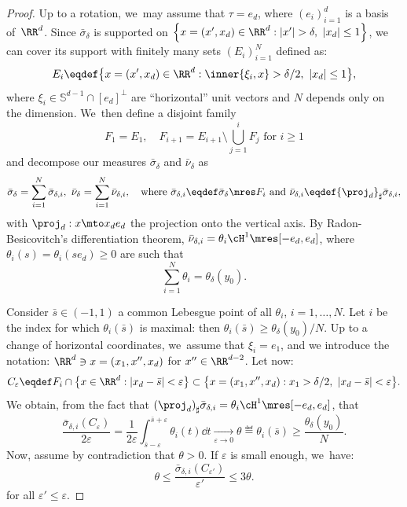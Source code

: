 \begin{proof}
Up to a rotation, we~may assume that $\tau = e_d$, where $(e_i)_{i = 1}^d$ is a basis of~${\RR}^d$.
Since $\bar \sigma_{\delta}$ is supported on $\left\{x = (x',x_d) \in {\RR}^d : |x'|>\delta,\ |x_d|\le 1 \right\}$,
we can cover its support with finitely many sets
$(E_i)_{i=1}^N$ defined as:
\[
E_i
\eqdef
\bigl\{
x = (x',x_d) \in {\RR}^d :
\inner{\xi_i, x} > \delta/2,
\ |x_d| \le 1
\bigr\},
\]
where $\xi_i \in \mathbb{S}^{d-1} \cap [e_d]^\perp$ are ``horizontal'' unit
vectors and $N$ depends only on the dimension. We~then define a disjoint family
\[
F_1 = E_1, \quad F_{i+1} = E_{i+1}\setminus \bigcup_{j=1}^i F_j \text{ for $i\ge 1$}
\]
and decompose our measures $\bar \sigma_{\delta}$ and $\bar \nu_{\delta}$ as
\[
\bar \sigma_{\delta} = \sum_{i = 1}^N \bar \sigma_{\delta, i}, \
\bar \nu_{\delta} = \sum_{i = 1}^N \bar \nu_{\delta, i},\quad
\text{where }
\bar \sigma_{\delta, i} \eqdef \bar \sigma_{\delta} \mres F_i
\text{ and }
\bar \nu_{\delta, i} \eqdef {\proj_d}_\sharp\bar \sigma_{\delta, i},
\]
with $\proj_d : x\mto x_d e_d$ the projection onto the vertical axis.
By Radon-Be\-si\-co\-vitch's differentiation theorem, $\bar \nu_{\delta, i} = \theta_i \cH^1\mres[-e_d, e_d]$, where $\theta_i(s) = \theta_i(s e_d)\ge 0$ are such that
\[
\sum_{i = 1}^N \theta_i = \theta_\delta(y_0).
\]

Consider $\bar s\in (-1,1)$ a common Lebesgue point of all $\theta_i$,
$i=1,\dots, N$. Let $i$ be the index for which $\theta_i(\bar s)$ is maximal: then $\theta_i(\bar s) \ge \theta_\delta(y_0)/N$. Up to a change of horizontal coordinates, we~assume that $\xi_i = e_1$,
and we introduce the notation: $\RR^d \ni x = (x_1, x'', x_d)$ for $x'' \in \RR^{d-2}$.
Let now:
\begin{equation*}
C_{\varepsilon}
\eqdef
F_i \cap \bigl\{ x \in\RR^d : |x_d- \bar s|<\varepsilon \bigr\}
\subset \bigl\{
x = (x_1, x'', x_d) :
x_1 > \delta/2,
\ |x_d - \bar s| < \varepsilon
\bigr\}.
\end{equation*}
We obtain, from the fact that ${(\proj_d)}_\sharp \bar \sigma_{\delta, i} = \theta_i\cH^1\mres [-e_d,e_d]$, that
\[
\frac{\bar \sigma_{\delta, i}(C_\varepsilon)}{2\varepsilon} =
\frac{1}{2\varepsilon} \int_{\bar s-\varepsilon}^{\bar s+\varepsilon}\theta_i(t)\dd t
\xrightarrow[\varepsilon \to 0]{}
\theta \eqdef \theta_i(\bar s) \ge \frac{\theta_\delta(y_0)}{N}.
\]
Now, assume by contradiction that $\theta>0$. If $\varepsilon$ is small enough, we~have:
\begin{equation}\label{eq.condition_t}
\theta
\le
\frac{\bar \sigma_{\delta, i}(C_{\varepsilon'})}{\varepsilon'}
\le
3\theta.
\end{equation}
for all $\varepsilon'\le \varepsilon$.


\end{proof}
